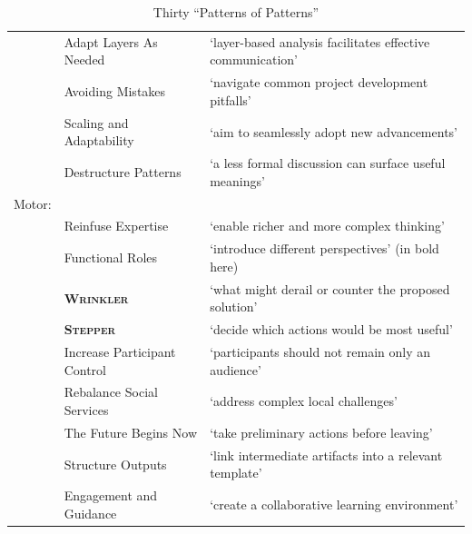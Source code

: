 \documentclass[acmlarge,timestamp]{acmart}
\begin{document}
\begin{table}[p]
\begin{tabular}{rll}
&{\sc Adapt Layers As Needed}& ‘layer-based analysis facilitates effective communication’\\
&{\sc Avoiding Mistakes}& ‘navigate common project development pitfalls’\\
&{\sc Scaling and Adaptability}& ‘aim to seamlessly adopt new advancements’\\
&{\sc Destructure Patterns}& ‘a less formal discussion can surface useful meanings’\\
Motor: && \\
&{\sc Reinfuse Expertise }& ‘enable richer and more complex thinking’\\
&{\sc Functional Roles}& ‘introduce different perspectives’ (in bold here)\\
&{\bfseries\scshape Wrinkler}& ‘what might derail or counter the proposed solution’\\
&{\bfseries\scshape Stepper}& ‘decide which actions would be most useful’\\
&{\sc Increase Participant Control}& ‘participants should not remain only an audience’\\
&{\sc Rebalance Social Services}& ‘address complex local challenges’\\
&{\sc The Future Begins Now}& ‘take preliminary actions before leaving’\\
&{\sc Structure Outputs}& ‘link intermediate artifacts into a relevant template’\\
&{\sc Engagement and Guidance}& ‘create a collaborative learning environment’\\
  \end{tabular}
  \smallskip
  \caption{Thirty “Patterns of Patterns”\label{summary}}
\end{table}

\clearpage
\end{document}

